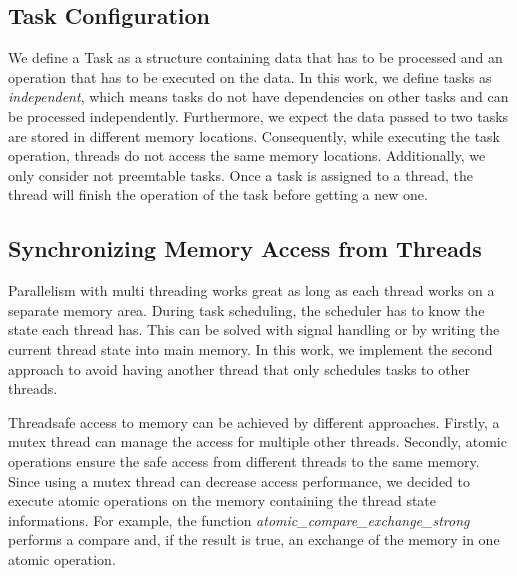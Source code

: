 \documentclass[conference]{IEEEtran}
\begin{document}
\subsection{Task Configuration}
We define a Task as a structure containing data that has to be processed and an operation that has to be executed on the data. In this work, we define tasks as \emph{independent}, which means tasks do not have dependencies on other tasks and can be processed independently. Furthermore, we expect the data passed to two tasks are stored in different memory locations. Consequently, while executing the task operation, threads do not access the same memory locations. Additionally, we only consider not preemtable tasks. Once a task is assigned to a thread, the thread will finish the operation of the task before getting a new one. 

\subsection{Synchronizing Memory Access from Threads}
Parallelism with multi threading works great as long as each thread works on a separate memory area. During task scheduling, the scheduler has to know the state each thread has. This can be solved with signal handling or by writing the current thread state into main memory. In this work, we implement the second approach to avoid having another thread that only schedules tasks to other threads. 

Threadsafe access to memory can be achieved by different approaches. Firstly, a mutex thread can manage the access for multiple other threads. Secondly, atomic operations ensure the safe access from different threads to the same memory. Since using a mutex thread can decrease access performance, we decided to execute atomic operations on the memory containing the thread state informations. For example, the function \emph{atomic\_compare\_exchange\_strong} performs a compare and, if the result is true, an exchange of the memory in one atomic operation.

\end{document}
